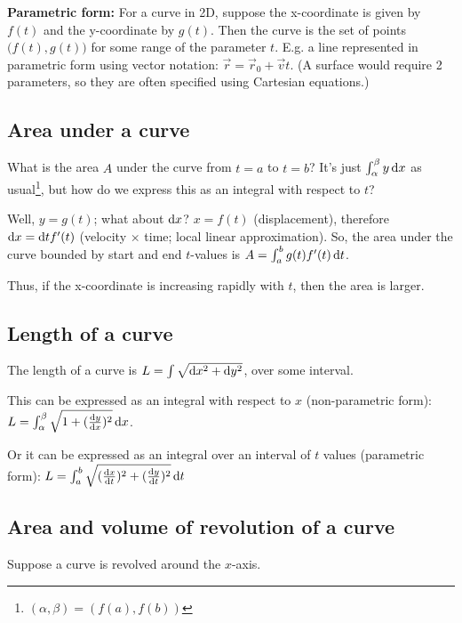\textbf{Parametric form:} For a curve in 2D, suppose the x-coordinate is given
by $f(t)$ and the y-coordinate by $g(t)$. Then the curve is the set of points
$\big(f(t), g(t)\big)$ for some range of the parameter $t$. E.g. a line
represented in parametric form using vector notation:
$\vec r = \vec r_0 + \vec v t$. (A surface would require 2 parameters, so they
are often specified using Cartesian equations.)


\subsection{Area under a curve}

What is the area $A$ under the curve from $t=a$ to $t=b$? It's just
$\int_\alpha^\beta y \dx$ as usual\footnote{$(\alpha, \beta) = (f(a), f(b))$},
but how do we express this as an integral with respect to $t$?

Well, $y = g(t)$; what about $\dx$? $x = f(t)$ (displacement), therefore
$\dx = \dt f'(t)$ (velocity $\times$ time; local linear approximation). So, the
area under the curve bounded by start and end $t$-values is
$A = \int_a^b g(t) f'(t) \dt$.

Thus, if the x-coordinate is increasing rapidly with $t$, then the area is
larger.

\subsection{Length of a curve}

The length of a curve is $L = \int \sqrt{\dx^2 + \dy^2}$, over some interval.

This can be expressed as an integral with respect to $x$ (non-parametric form):
$L = \int_\alpha^\beta \sqrt{1 + (\frac{\dy}{\dx})^2} \dx$.

Or it can be expressed as an integral over an interval of $t$ values (parametric form):
$L = \int_a^b \sqrt{ (\frac{\dx}{\dt})^2 + (\frac{\dy}{\dt})^2} \dt$

\subsection{Area and volume of revolution of a curve}
Suppose a curve is revolved around the $x$-axis.

